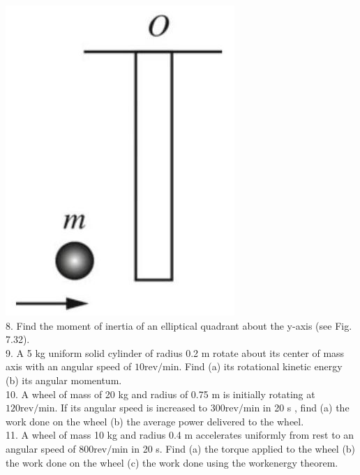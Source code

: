 \documentclass[10pt]{article}
\begin{document}
\includegraphics[max width=\textwidth, center]{2024_09_13_db1f357d2aad0a03eb2eg-129}\\
8. Find the moment of inertia of an elliptical quadrant about the y-axis (see Fig. 7.32).\\
9. A 5 kg uniform solid cylinder of radius 0.2 m rotate about its center of mass axis with an angular speed of $10 \mathrm{rev} / \mathrm{min}$. Find (a) its rotational kinetic energy (b) its angular momentum.\\
10. A wheel of mass of 20 kg and radius of 0.75 m is initially rotating at $120 \mathrm{rev} / \mathrm{min}$. If its angular speed is increased to $300 \mathrm{rev} / \mathrm{min}$ in 20 s , find (a) the work done on the wheel (b) the average power delivered to the wheel.\\
11. A wheel of mass 10 kg and radius 0.4 m accelerates uniformly from rest to an angular speed of $800 \mathrm{rev} / \mathrm{min}$ in 20 s. Find (a) the torque applied to the wheel (b) the work done on the wheel (c) the work done using the workenergy theorem.\\
\end{document}
